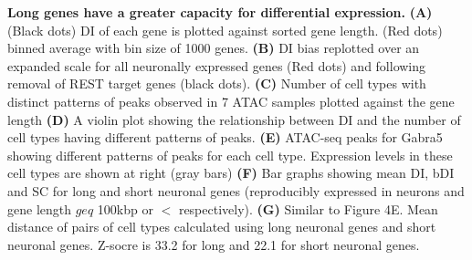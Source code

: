\textbf{Long genes have a greater capacity for differential expression.}
\textbf{(A)} (Black dots) DI of each gene is plotted against sorted gene length. (Red dots) binned average with bin size of 1000 genes.
\textbf{(B)} DI bias replotted over an expanded scale for all neuronally expressed genes (Red dots) and following removal of REST target genes (black dots).
\textbf{(C)} Number of cell types with distinct patterns of peaks observed in 7 ATAC samples plotted against the gene length
\textbf{(D)} A violin plot showing the relationship between DI and the number of cell types having different patterns of peaks. 
\textbf{(E)} ATAC-seq peaks for Gabra5 showing different patterns of peaks for each cell type. Expression levels in these cell types are shown at right (gray bars)
\textbf{(F)} Bar graphs showing mean DI, bDI and SC for long and short neuronal genes (reproducibly expressed in neurons and gene length $geq$ 100kbp or $<$ respectively). 
\textbf{(G)} Similar to Figure 4E. Mean distance of pairs of cell types calculated using long neuronal genes and short neuronal genes. Z-socre is 33.2 for long and 22.1 for short neuronal genes. 
